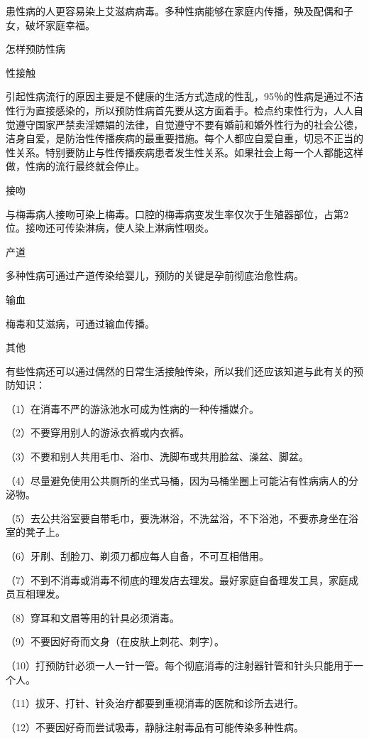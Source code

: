 \documentclass[12pt,UTF8]{ctexbook}
\begin{document}
患性病的人更容易染上艾滋病病毒。多种性病能够在家庭内传播，殃及配偶和子女，破坏家庭幸福。





怎样预防性病


性接触

引起性病流行的原因主要是不健康的生活方式造成的性乱，95％的性病是通过不洁性行为直接感染的，所以预防性病首先要从这方面着手。检点约束性行为，人人自觉遵守国家严禁卖淫嫖娼的法律，自觉遵守不要有婚前和婚外性行为的社会公德，洁身自爱，是防治性传播疾病的最重要措施。每个人都应自爱自重，切忌不正当的性关系。特别要防止与性传播疾病患者发生性关系。如果社会上每一个人都能这样做，性病的流行最终就会停止。

接吻

与梅毒病人接吻可染上梅毒。口腔的梅毒病变发生率仅次于生殖器部位，占第2位。接吻还可传染淋病，使人染上淋病性咽炎。

产道

多种性病可通过产道传染给婴儿，预防的关键是孕前彻底治愈性病。

输血

梅毒和艾滋病，可通过输血传播。

其他

有些性病还可以通过偶然的日常生活接触传染，所以我们还应该知道与此有关的预防知识：

（1）在消毒不严的游泳池水可成为性病的一种传播媒介。

（2）不要穿用别人的游泳衣裤或内衣裤。

（3）不要和别人共用毛巾、浴巾、洗脚布或共用脸盆、澡盆、脚盆。

（4）尽量避免使用公共厕所的坐式马桶，因为马桶坐圈上可能沾有性病病人的分泌物。

（5）去公共浴室要自带毛巾，要洗淋浴，不洗盆浴，不下浴池，不要赤身坐在浴室的凳子上。

（6）牙刷、刮脸刀、剃须刀都应每人自备，不可互相借用。

（7）不到不消毒或消毒不彻底的理发店去理发。最好家庭自备理发工具，家庭成员互相理发。

（8）穿耳和文眉等用的针具必须消毒。

（9）不要因好奇而文身（在皮肤上刺花、刺字）。

（10）打预防针必须一人一针一管。每个彻底消毒的注射器针管和针头只能用于一个人。

（11）拔牙、打针、针灸治疗都要到重视消毒的医院和诊所去进行。

（12）不要因好奇而尝试吸毒，静脉注射毒品有可能传染多种性病。
\end{document}
